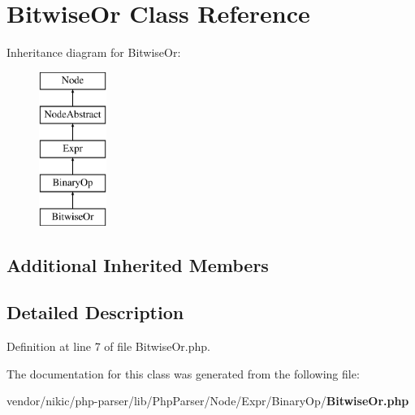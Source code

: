 \section{Bitwise\+Or Class Reference}
\label{class_php_parser_1_1_node_1_1_expr_1_1_binary_op_1_1_bitwise_or}
Inheritance diagram for Bitwise\+Or\+:\begin{figure}[H]
\begin{center}
\leavevmode
\includegraphics[height=5.000000cm]{class_php_parser_1_1_node_1_1_expr_1_1_binary_op_1_1_bitwise_or}
\end{center}
\end{figure}
\subsection*{Additional Inherited Members}


\subsection{Detailed Description}


Definition at line 7 of file Bitwise\+Or.\+php.



The documentation for this class was generated from the following file\+:\begin{DoxyCompactItemize}
\item 
vendor/nikic/php-\/parser/lib/\+Php\+Parser/\+Node/\+Expr/\+Binary\+Op/{\bf Bitwise\+Or.\+php}\end{DoxyCompactItemize}
